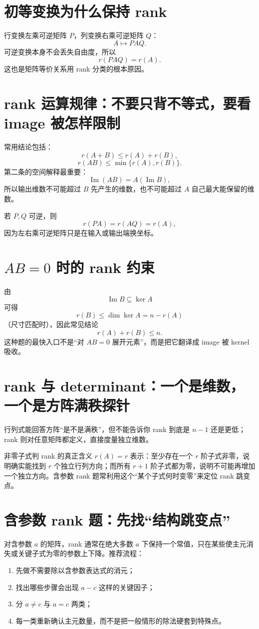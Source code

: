 \documentclass[11pt,a4paper,openany]{ctexbook}
\begin{document}
\section{初等变换为什么保持 rank}
行变换左乘可逆矩阵 $P$，列变换右乘可逆矩阵 $Q$：
\[
A\mapsto PAQ.
\]
可逆变换本身不会丢失自由度，所以
\[
\boxed{r(PAQ)=r(A)}.
\]
这也是矩阵等价关系用 rank 分类的根本原因。

\section{rank 运算规律：不要只背不等式，要看 image 被怎样限制}
常用结论包括：
\[
r(A+B)\le r(A)+r(B),
\]
\[
r(AB)\le \min\{r(A),r(B)\}.
\]
第二条的空间解释最重要：
\[
\operatorname{Im}(AB)=A(\operatorname{Im}B),
\]
所以输出维数不可能超过 $B$ 先产生的维数，也不可能超过 $A$ 自己最大能保留的维数。

若 $P,Q$ 可逆，则
\[
r(PA)=r(AQ)=r(A),
\]
因为左右乘可逆矩阵只是在输入或输出端换坐标。

\section{\texorpdfstring{$AB=0$}{AB=0} 时的 rank 约束}
由
\[
\operatorname{Im}B\subseteq\ker A
\]
可得
\[
r(B)\le \dim\ker A=n-r(A)
\]
（尺寸匹配时），因此常见结论
\[
\boxed{r(A)+r(B)\le n.}
\]
这种题的最快入口不是“对 $AB=0$ 展开元素”，而是把它翻译成 image 被 kernel 吸收。

\section{rank 与 determinant：一个是维数，一个是方阵满秩探针}
行列式能回答方阵“是不是满秩”，但不能告诉你 rank 到底是 $n-1$ 还是更低；rank 则对任意矩阵都定义，直接度量独立维数。

\begin{boundarybox}{非零子式判 rank 的真正含义}
$r(A)=r$ 表示：至少存在一个 $r$ 阶子式非零，说明确实能找到 $r$ 个独立行列方向；而所有 $r+1$ 阶子式都为零，说明不可能再增加一个独立方向。含参数 rank 题常利用这个“某个子式何时变零”来定位 rank 跳变点。
\end{boundarybox}

\section{含参数 rank 题：先找“结构跳变点”}
对含参数 $a$ 的矩阵，rank 通常在绝大多数 $a$ 下保持一个常值，只在某些使主元消失或关键子式为零的参数上下降。推荐流程：
\begin{enumerate}
  \item 先做不需要除以含参数表达式的消元；
  \item 找出哪些步骤会出现 $a-c$ 这样的关键因子；
  \item 分 $a\neq c$ 与 $a=c$ 两类；
  \item 每一类重新确认主元数量，而不是把一般情形的除法硬套到特殊点。
\end{enumerate}
\end{document}
